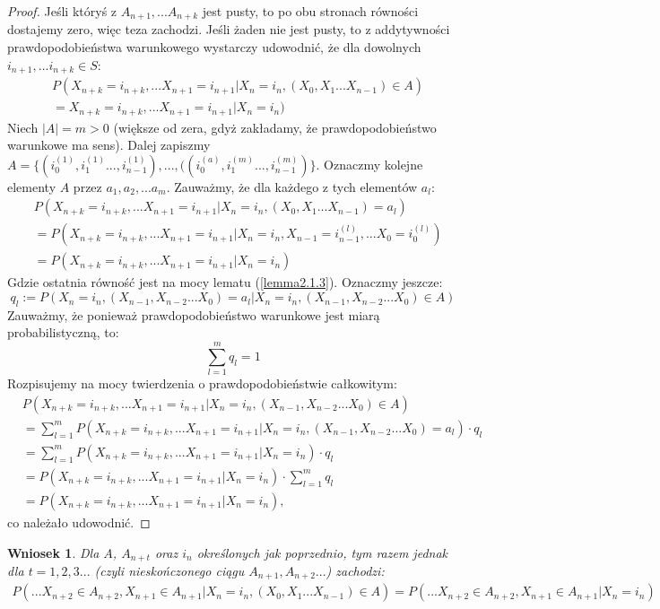 \documentclass[a4paper]{article}
\theoremstyle{defn}
\theoremstyle{theorem}
\theoremstyle{lemma}
\theoremstyle{cor}
\newtheorem{cor}[defn]{Wniosek}
\theoremstyle{fact}
\begin{document}
\begin{proof}
Jeśli któryś z $A_{n+1}, ... A_{n+k}$ jest pusty, to po obu stronach równości dostajemy zero, więc teza zachodzi. Jeśli żaden nie jest pusty, to z addytywności prawdopodobieństwa warunkowego wystarczy udowodnić, że dla dowolnych $i_{n+1}, ... i_{n+k} \in S$:
\begin{align*}
&P(X_{n+k} = i_{n+k}, ...X_{n+1} = i_{n+1} |X_n = i_n, (X_{0}, X_{1} ... X_{n-1}) \in A)\\
&= X_{n+k} = i_{n+k}, ...X_{n+1} = i_{n+1} |X_n = i_n)
\end{align*}
Niech $|A| = m > 0$ (większe od zera, gdyż zakładamy, że prawdopodobieństwo warunkowe ma sens). Dalej zapiszmy $A = \{(i_0^{(1)}, i_1^{(1)}..., i_{n-1}^{(1)}), ..., ((i_0^{(a)}, i_1^{(m)}..., i_{n-1}^{(m)})\}$. Oznaczmy kolejne elementy $A$ przez $a_1, a_2, ... a_m$.
Zauważmy, że dla każdego z tych elementów $a_l$:
\begin{align*}
    &P(X_{n+k} = i_{n+k}, ...X_{n+1} = i_{n+1} |X_n = i_n, (X_{0}, X_{1} ... X_{n-1}) = a_l) \\
    &= P(X_{n+k} = i_{n+k}, ...X_{n+1} = i_{n+1} |X_n = i_n, X_{n-1} = i_{n-1}^{(l)}, ... X_0 = i_{0}^{(l)})\\
    &= P(X_{n+k} = i_{n+k}, ...X_{n+1} = i_{n+1} |X_n = i_n)
\end{align*}
Gdzie ostatnia równość jest na mocy lematu (\ref{lemma2.1.3}). Oznaczmy jeszcze:
$$ q_l :=P(X_n = i_n, (X_{n-1}, X_{n-2} ... X_0) = a_l|X_n = i_n, (X_{n-1}, X_{n-2} ... X_0) \in A)$$
Zauważmy, że ponieważ prawdopodobieństwo warunkowe jest miarą probabilistyczną, to:
$$\sum\limits_{l = 1}^m q_l = 1$$
Rozpisujemy na mocy twierdzenia o prawdopodobieństwie całkowitym:
\begin{align*}
    &P(X_{n+k} = i_{n+k}, ...X_{n+1} = i_{n+1} |X_n = i_n, (X_{n-1}, X_{n-2} ... X_0) \in A) \\
    &= \sum\limits_{l = 1}^m  P(X_{n+k} = i_{n+k}, ...X_{n+1} = i_{n+1} |X_n = i_n, (X_{n-1}, X_{n-2} ... X_0) = a_l)\cdot q_l\\
    &= \sum\limits_{l = 1}^m  P(X_{n+k} = i_{n+k}, ...X_{n+1} = i_{n+1} |X_n = i_n)\cdot q_l\\
    &= P(X_{n+k} = i_{n+k}, ...X_{n+1} = i_{n+1} |X_n = i_n) \cdot \sum\limits_{l = 1}^m q_l \\
    &= P(X_{n+k} = i_{n+k}, ...X_{n+1} = i_{n+1} |X_n = i_n),
\end{align*}
co należało udowodnić.
\end{proof}
\begin{cor}\label{cor2.1.5}
Dla $A$, $A_{n+t}$ oraz $i_n$ określonych jak poprzednio, tym razem jednak dla $t = 1,2,3...$ (czyli nieskończonego ciągu $A_{n+1}, A_{n+2}...$) zachodzi:
\begin{align*}
P(...X_{n+2} \in A_{n+2}, X_{n+1} \in A_{n+1}|X_n = i_n, (X_{0}, X_{1} ... X_{n-1}) \in A) = P(...X_{n+2} \in A_{n+2}, X_{n+1} \in A_{n+1}|X_n = i_n)
\end{align*}
\end{cor}\label{cor2.1.5}
\end{document}

